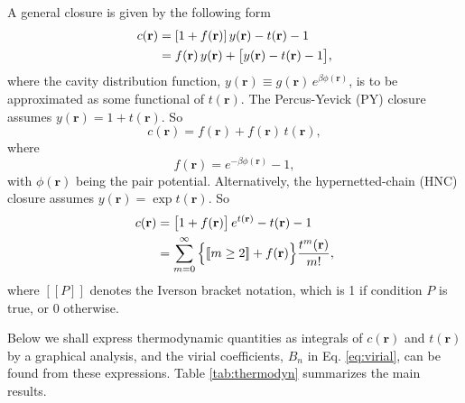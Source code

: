 \documentclass[preprint]{revtex4-1}
\newcommand{\vct}[1]{\mathbf{#1}}
\providecommand{\vr}{} %
\renewcommand{\vr}{\vct{r}}
\newcommand{\llbra}{[\![}
\newcommand{\llket}{]\!]}
\begin{document}
A general closure is given by the following form
%
\begin{align}
  c(\vr)
&= [1 + f(\vr)] \, y(\vr) - t(\vr) - 1
  \notag \\
&= f(\vr) \, y(\vr) + \big[ y(\vr) - t(\vr) - 1 \big],
  \label{eq:closure}
\end{align}
%
where the cavity distribution function,
$y(\vr) \equiv g(\vr) \, e^{ \beta \phi(\vr) }$,
is to be approximated as some functional of $t(\vr)$.
%
The Percus-Yevick (PY) closure\cite{percusyevick}
assumes $y(\vr) = 1 + t(\vr)$.
%
So
%
\begin{equation}
  c(\vr) = f(\vr) + f(\vr) \, t(\vr),
  \label{eq:py}
\end{equation}
%
where
%
\begin{equation}
  f(\vr) = e^{-\beta \phi(\vr)} - 1,
  \label{eq:fbond}
\end{equation}
%
with $\phi(\vr)$ being the pair potential.
%
Alternatively,
the hypernetted-chain (HNC) closure\cite{
morita1958, *morita1959, *morita1960,
vanleeuwen1959, meeron1960,
verlet1960, green1960, rushbrooke1960}
assumes $y(\vr) = \exp { t(\vr) }$.
%
So
%
\begin{align}
c(\vr)
&= \big[ 1 + f(\vr) \big] \, e^{t(\vr)} - t(\vr) - 1
\notag \\
&= \sum_{m=0}^\infty
   \Big\{ \llbra m \ge 2 \llket + f(\vr) \Big\}
   \frac{ t^m(\vr) }{ m! },
\label{eq:hnc}
\end{align}
%
where
$\llbra P \llket$ denotes the Iverson bracket notation,
which is 1 if condition $P$ is true,
or 0 otherwise.



Below we shall express thermodynamic quantities
as integrals of $c(\vr)$ and $t(\vr)$
by a graphical analysis,
%
and the virial coefficients,
$B_n$ in Eq. \eqref{eq:virial},
can be found from these expressions.
%
Table \ref{tab:thermodyn}
summarizes the main results.





\ifdim \columnwidth < 4in
  \newcommand{\tabscale}{1.0}
\else
  \newcommand{\tabscale}{0.85}
\fi
\end{document}
